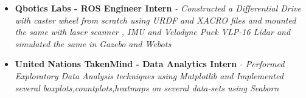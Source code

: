 \documentclass{article}
\begin{document}
\begin{itemize}
    \item{\textbf{\large{Qbotics Labs - ROS Engineer Intern}}}
          \newline
          \textit{- Constructed a Differential Drive with caster wheel from scratch using URDF and XACRO files and mounted the same with laser scanner , IMU and Velodyne Puck VLP-16 Lidar and simulated the same in Gazebo and Webots}
\end{itemize}


\begin{itemize}
    \item{\textbf{\large{United Nations TakenMind - Data Analytics Intern}}}
          \newline
          \textit{- Performed Exploratory Data Analysis techniques using Matplotlib and
              Implemented several boxplots,countplots,heatmaps on several data-sets using Seaborn }
\end{itemize}
\end{document}
